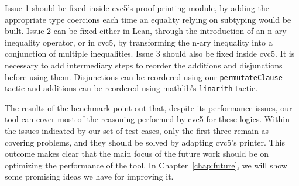 Issue 1 should be fixed inside cvc5's proof printing module, by adding the appropriate type coercions
each time an equality relying on subtyping would be built.
%
Issue 2 can be fixed either in Lean, through the introduction of an n-ary inequality operator,
or in cvc5, by transforming the n-ary inequality into a conjunction of multiple inequalities.
%
Issue 3 should also be fixed inside cvc5. It is necessary to add intermediary steps to reorder the
additions and disjunctions before using them. Disjunctions can be reordered using our \texttt{permutateClause}
tactic and additions can be reordered using mathlib's \texttt{linarith} tactic.

The results of the benchmark point out that, despite its performance issues, our tool can
cover most of the reasoning performed by cvc5 for these logics. Within the issues indicated by our set of
test cases, only the first three remain as covering problems, and they should be solved
by adapting cvc5's printer. This outcome makes clear that the main focus of the future work
should be on optimizing the performance of the tool. In Chapter~\ref{chap:future}, we
will show some promising ideas we have for improving it.





